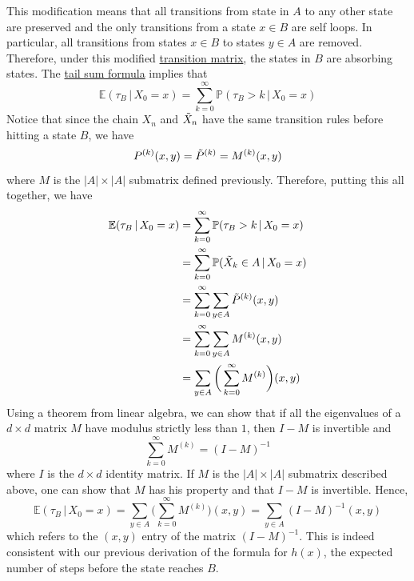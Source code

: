    This modification means that all transitions from state in $A$ to any other state are preserved and the only transitions from a state $x \in B$ are self loops. In particular, all transitions from states $x \in B$ to states $y \in A$ are removed. Therefore, under this modified \hyperref[def:transition-matrix]{transition matrix}, the states in $B$ are absorbing states. The \hyperref[thm:tail-sum-formula]{tail sum formula} implies that
    \begin{equation}
      \mathbb{E}(\tau_B \,|\, X_0 = x) = \sum_{k=0}^\infty \mathbb{P}(\tau_B > k \,|\, X_0 = x)
    \end{equation}
    Notice that since the chain $X_n$ and $\Tilde{X}_n$ have the same transition rules before hitting a state $B$, we have 
    \begin{equation}
      P^{(k)} (x, y) = \Tilde{P}^{(k)} = M^{(k)}(x, y)
    \end{equation}
    where $M$ is the $|A| \times |A|$ submatrix defined previously. Therefore, putting this all together, we have
    \begin{align*}
      \mathbb{E}(\tau_B \,|\, X_0 = x) & = \sum_{k=0}^\infty \mathbb{P}(\tau_B > k \,|\, X_0 = x) \\
      & = \sum_{k=0}^\infty \mathbb{P}(\Tilde{X}_k \in A \,|\, X_0 = x) \\
      & = \sum_{k=0}^\infty \sum_{y \in A} \Tilde{P}^{(k)} (x, y) \\
      & = \sum_{k=0}^\infty \sum_{y \in A} M^{(k)} (x, y) \\
      & = \sum_{y \in A} \bigg( \sum_{k=0}^\infty M^{(k)} \bigg) (x, y) 
    \end{align*}
    Using a theorem from linear algebra, we can show that if all the eigenvalues of a $d \times d$ matrix $M$ have modulus strictly less than $1$, then $I-M$ is invertible and
    \begin{equation}
      \sum_{k=0}^\infty M^{(k)} = (I - M)^{-1}
    \end{equation}
    where $I$ is the $d \times d$ identity matrix. If $M$ is the $|A| \times |A|$ submatrix described above, one can show that $M$ has his property and that $I - M$ is invertible. Hence, 
    \begin{equation}
      \mathbb{E}(\tau_B \,|\, X_0 = x) = \sum_{y \in A} \bigg( \sum_{k=0}^\infty M^{(k)} \bigg) (x, y) = \sum_{y \in A} (I-M)^{-1} (x, y)
    \end{equation}
    which refers to the $(x, y)$ entry of the matrix $(I - M)^{-1}$. This is indeed consistent with our previous derivation of the formula for $h(x)$, the expected number of steps before the state reaches $B$. 

